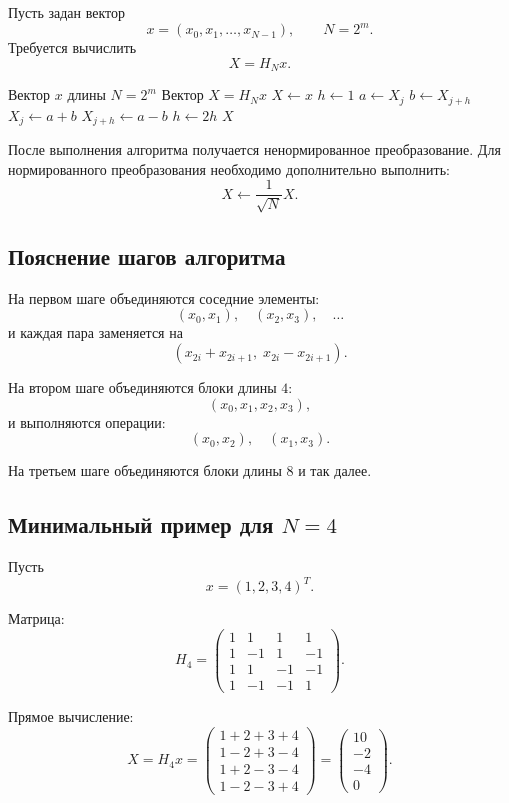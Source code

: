 \documentclass[12pt,a4paper]{article}
\begin{document}
Пусть задан вектор
\[
    x=(x_0,x_1,\ldots,x_{N-1}),
\qquad N=2^m.
\]
Требуется вычислить
\[
    X=H_Nx.
\]

\begin{algorithm}[H]
\caption{Быстрое преобразование Адамара--Уолша}
\begin{algorithmic}[1]
\Require Вектор $x$ длины $N=2^m$
\Ensure Вектор $X=H_Nx$
\State $X \gets x$
\State $h \gets 1$
            \State $a \gets X_j$
            \State $b \gets X_{j+h}$
            \State $X_j \gets a+b$
            \State $X_{j+h} \gets a-b$
        \EndFor
    \EndFor
    \State $h \gets 2h$
\EndWhile
\State \Return $X$
\end{algorithmic}
\end{algorithm}

После выполнения алгоритма получается ненормированное преобразование. Для нормированного преобразования необходимо дополнительно выполнить:
\[
    X\gets \frac{1}{\sqrt{N}}X.
\]

\subsection{Пояснение шагов алгоритма}

На первом шаге объединяются соседние элементы:
\[
(x_0,x_1),\quad (x_2,x_3),\quad \ldots
\]
и каждая пара заменяется на
\[
(x_{2i}+x_{2i+1},\; x_{2i}-x_{2i+1}).
\]

На втором шаге объединяются блоки длины $4$:
\[
(x_0,x_1,x_2,x_3),
\]
и выполняются операции:
\[
(x_0,x_2),\quad (x_1,x_3).
\]

На третьем шаге объединяются блоки длины $8$ и так далее.

\subsection{Минимальный пример для $N=4$}

Пусть
\[
    x=(1,2,3,4)^T.
\]

Матрица:
\[
H_4=
\begin{pmatrix}
1&1&1&1\\
1&-1&1&-1\\
1&1&-1&-1\\
1&-1&-1&1
\end{pmatrix}.
\]

Прямое вычисление:
\[
X=H_4x=
\begin{pmatrix}
1+2+3+4\\
1-2+3-4\\
1+2-3-4\\
1-2-3+4
\end{pmatrix}
=
\begin{pmatrix}
10\\
-2\\
-4\\
0
\end{pmatrix}.
\]
\end{document}
